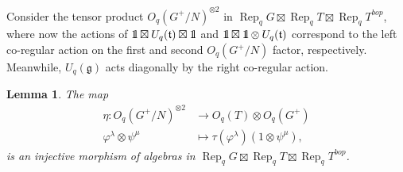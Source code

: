 \documentclass[a4paper]{article}
\numberwithin{equation}{section}
\newtheorem{lemma}[counter]{Lemma}
\newcommand{\idty}{{\mathrm{1}\mkern-4mu{\mathchoice{}{}{\mskip-0.5mu}{\mskip-1mu}}\mathrm{l}}}
\newcommand{\1}{{\mathrm{1}\mkern-4mu{\mathchoice{}{}{\mskip-0.5mu}{\mskip-1mu}}\mathrm{l}}}
\DeclareMathOperator{\Rep}{Rep}
\renewcommand{\t}{\mathfrak{t}}
\newcommand{\g}{\mathfrak{g}}
\begin{document}
Consider the tensor product $O_q(G^+/N)^{\otimes2}$ in $\Rep_qG\boxtimes \Rep_qT\boxtimes\Rep_q T^{bop}$, where now the actions of $\idty\boxtimes U_q(\t) \boxtimes \idty$ and $\idty\boxtimes\idty\otimes U_q(\t)$ correspond to the left co-regular action on the first and second $O_q(G^+/N)$ factor, respectively. Meanwhile, $U_q(\g)$ acts diagonally by the right co-regular action.
\begin{lemma}\label{lemma:non-localised-GN2-to-TxG-map}
    The map
    \begin{equation}
        \begin{aligned}
        \eta: O_q(G^+/N)^{\otimes 2} &\to O_q(T) \otimes O_q(G^+)\\
        \varphi^\lambda \otimes \psi^\mu &\mapsto \tau(\varphi^\lambda)(1\otimes\psi^\mu),
        \end{aligned}
    \end{equation}
        is an injective morphism of algebras in $\Rep_qG\boxtimes \Rep_qT\boxtimes \Rep_qT^{bop}$.
\end{lemma}
\end{document}
